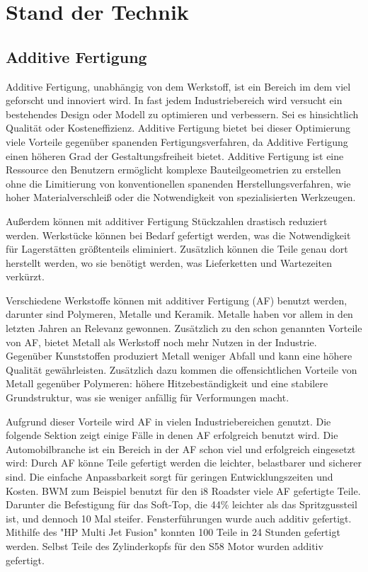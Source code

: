 \documentclass[../main.tex]{subfiles}
\begin{document}
\section{Stand der Technik}

\subsection{Additive Fertigung}

Additive Fertigung, unabhängig von dem Werkstoff, ist ein Bereich im dem viel
geforscht und innoviert wird. In fast jedem Industriebereich wird versucht ein
bestehendes Design oder Modell zu optimieren und verbessern.
Sei es hinsichtlich Qualität oder Kosteneffizienz. Additive Fertigung bietet bei 
dieser Optimierung viele Vorteile gegenüber spanenden Fertigungsverfahren, da 
Additive Fertigung einen höheren Grad der Gestaltungsfreiheit bietet. 
Additive Fertigung ist eine Ressource den Benutzern ermöglicht komplexe 
Bauteilgeometrien zu erstellen ohne die Limitierung von konventionellen spanenden 
Herstellungsverfahren, wie hoher Materialverschleiß oder die Notwendigkeit von 
spezialisierten Werkzeugen. \cite{Vafadar.2021} 

Außerdem können mit additiver Fertigung Stückzahlen drastisch reduziert werden.
Werkstücke können bei Bedarf gefertigt werden, was die Notwendigkeit für Lagerstätten
größtenteils eliminiert. Zusätzlich können die Teile genau dort herstellt werden, wo 
sie benötigt werden, was Lieferketten und Wartezeiten verkürzt.

Verschiedene Werkstoffe können mit additiver Fertigung (AF) benutzt werden, darunter
sind Polymeren, Metalle und Keramik. Metalle haben vor allem in den letzten Jahren 
an Relevanz gewonnen. Zusätzlich zu den schon genannten Vorteile von AF, 
bietet Metall als Werkstoff noch mehr Nutzen in der Industrie. Gegenüber Kunststoffen
produziert Metall weniger Abfall und kann eine höhere Qualität gewährleisten.
Zusätzlich dazu kommen die offensichtlichen Vorteile von Metall gegenüber Polymeren: 
höhere Hitzebeständigkeit und eine stabilere Grundstruktur, was sie weniger anfällig 
für Verformungen macht.

Aufgrund dieser Vorteile wird AF in vielen Industriebereichen genutzt. Die folgende
Sektion zeigt einige Fälle in denen AF erfolgreich benutzt wird.
Die Automobilbranche ist ein Bereich in der AF schon viel und erfolgreich 
eingesetzt wird:
Durch AF könne Teile gefertigt werden die leichter, belastbarer und sicherer sind. 
Die einfache Anpassbarkeit sorgt für geringen Entwicklungszeiten und Kosten. 
BWM zum Beispiel benutzt für den i8 Roadster viele AF gefertigte Teile.
Darunter die Befestigung für das Soft-Top, die 44\% leichter als das Spritzgussteil
ist, und dennoch 10 Mal steifer. \cite{Vafadar.2021} 
Fensterführungen wurde auch additiv gefertigt. Mithilfe des "HP Multi Jet Fusion" 
konnten 100 Teile in 24 Stunden gefertigt werden. Selbst Teile des Zylinderkopfs für den 
S58 Motor wurden additiv gefertigt. \cite{Anusci.2019}
\end{document}
